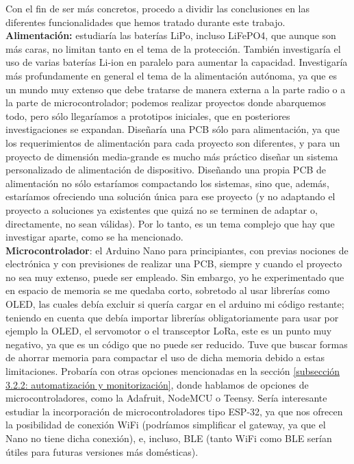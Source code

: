 \documentclass[12pt]{article}
\begin{document}
	\noindent Con el fin de ser más concretos, procedo a dividir las conclusiones en las diferentes funcionalidades que hemos tratado durante este trabajo. \\
	
	\noindent \textbf{Alimentación:} estudiaría las baterías LiPo, incluso LiFePO4, que aunque son más caras, no limitan tanto en el tema de la protección. También investigaría el uso de varias baterías Li-ion en paralelo para aumentar la capacidad. Investigaría más profundamente en general el tema de la alimentación autónoma, ya que es un mundo muy extenso que debe tratarse de manera externa a la parte radio o a la parte de microcontrolador; podemos realizar proyectos donde abarquemos todo, pero sólo llegaríamos a prototipos iniciales, que en posteriores investigaciones se expandan. Diseñaría una PCB sólo para alimentación, ya que los requerimientos de alimentación para cada proyecto son diferentes, y para un proyecto de dimensión media-grande es mucho más práctico diseñar un sistema personalizado de alimentación de dispositivo. Diseñando una propia PCB de alimentación no sólo estaríamos compactando los sistemas, sino que, además, estaríamos ofreciendo una solución única para ese proyecto (y no adaptando el proyecto a soluciones ya existentes que quizá no se terminen de adaptar o, directamente, no sean válidas). Por lo tanto, es un tema complejo que hay que investigar aparte, como se ha mencionado.\\
	
	\noindent \textbf{Microcontrolador}: el Arduino Nano para principiantes, con previas nociones de electrónica y con previsiones de realizar una PCB, siempre y cuando el proyecto no sea muy extenso, puede ser empleado. Sin embargo, yo he experimentado que en espacio de memoria se me quedaba corto, sobretodo al usar librerías como OLED, las cuales debía excluir si quería cargar en el arduino mi código restante; teniendo en cuenta que debía importar librerías obligatoriamente para usar por ejemplo la OLED, el servomotor o el transceptor LoRa, este es un punto muy negativo, ya que es un código que no puede ser reducido. Tuve que buscar formas de ahorrar memoria para compactar el uso de dicha memoria debido a estas limitaciones. Probaría con otras opciones mencionadas en la sección \ref{subsección 3.2.2: automatización y monitorización}, donde hablamos de opciones de microcontroladores, como la Adafruit, NodeMCU o Teensy. Sería interesante estudiar la incorporación de microcontroladores tipo ESP-32, ya que nos ofrecen la posibilidad de conexión WiFi (podríamos simplificar el gateway, ya que el Nano no tiene dicha conexión), e, incluso, BLE (tanto WiFi como BLE serían útiles para futuras versiones más domésticas).   \\
	
\end{document}
